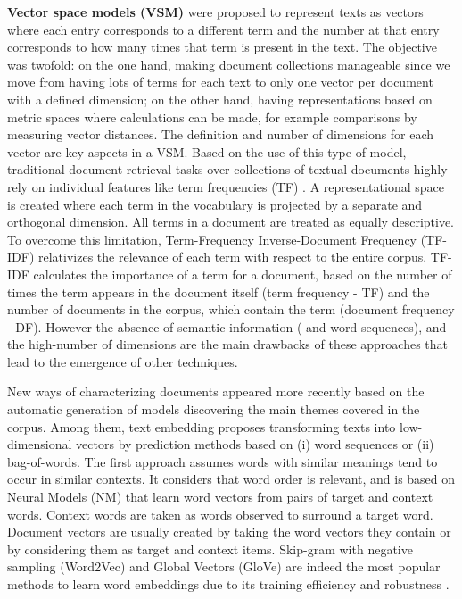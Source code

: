 \textbf{Vector space models (VSM)} \citep{Salton1983} were proposed to represent texts as vectors where each entry corresponds to a different term and the number at that entry corresponds to how many times that term is present in the text. The objective was twofold: on the one hand, making document collections manageable since we move from having lots of terms for each text to only one vector per document with a defined dimension; on the other hand, having representations based on metric spaces where calculations can be made, for example comparisons by measuring vector distances. The definition and number of dimensions for each vector are key aspects in a VSM. Based on the use of this type of model, traditional document retrieval tasks over collections of textual documents highly rely on individual features like term frequencies (TF) \citep{Hearst1999}. A representational space is created where each term in the vocabulary is projected by a separate and orthogonal dimension. All terms in a document are treated as equally descriptive. To overcome this limitation, Term-Frequency Inverse-Document Frequency (TF-IDF) \citep{lee1995} relativizes the relevance of each term with respect to the entire corpus. TF-IDF calculates the importance of a term for a document, based on the number of times the term appears in the document itself (term frequency - TF) and the number of documents in the corpus, which contain the term (document frequency - DF). However the absence of semantic information ( and word sequences), and the high-number of dimensions are the main drawbacks of these approaches that lead to the emergence of other techniques. 

New ways of characterizing documents appeared more recently based on the automatic generation of models discovering the main themes covered in the corpus. Among them, text embedding proposes transforming texts into low-dimensional vectors by prediction methods based on (i) word sequences or (ii) bag-of-words. The first approach assumes words with similar meanings tend to occur in similar contexts. It considers that word order is relevant, and is based on Neural Models (NM) that learn word vectors from pairs of target and context words. Context words are taken as words observed to surround a target word. Document vectors are usually created by taking the word vectors they contain or by considering them as target and context items. Skip-gram with negative sampling (Word2Vec) \citep{Mikolov2013c} and Global Vectors (GloVe) \citep{pennington2014} are indeed the most popular methods to learn word embeddings due to its training efficiency and robustness \citep{levy2015}. 

